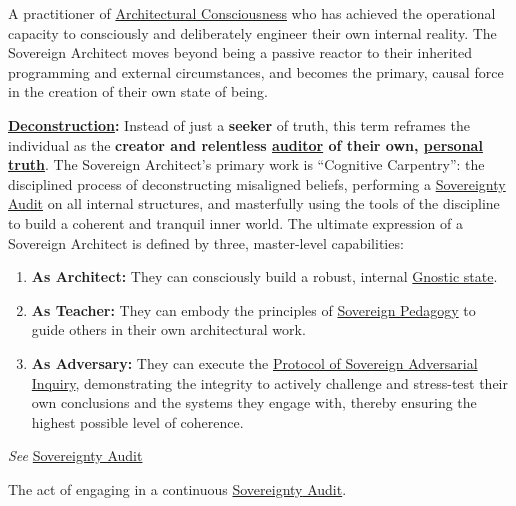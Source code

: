 \item[\hypertarget{gloss:sovereign_architect}{Sovereign Architect}]
    A practitioner of \hyperlink{gloss:architectural_consciousness}{Architectural Consciousness} who has achieved the operational capacity to consciously and deliberately engineer their own internal reality. The Sovereign Architect moves beyond being a passive reactor to their inherited programming and external circumstances, and becomes the primary, causal force in the creation of their own state of being.
    \begin{nobullet}
        \item \textbf{\hyperlink{gloss:deconstruction}{Deconstruction}:} Instead of just a \textbf{seeker} of truth, this term reframes the individual as the \textbf{creator and relentless \underline{auditor} of their own, \underline{personal truth}}. The Sovereign Architect's primary work is ``Cognitive Carpentry'': the disciplined process of deconstructing misaligned beliefs, performing a \hyperlink{gloss:sovereignty_audit}{Sovereignty Audit} on all internal structures, and masterfully using the tools of the discipline to build a coherent and tranquil inner world. The ultimate expression of a Sovereign Architect is defined by three, master-level capabilities:
        \begin{enumerate}
            \item \textbf{As Architect:} They can consciously build a robust, internal \hyperlink{gloss:gnostic_state}{Gnostic state}.
            \item \textbf{As Teacher:} They can embody the principles of \hyperlink{gloss:sovereign_pedagogy}{Sovereign Pedagogy} to guide others in their own architectural work.
            \item \textbf{As Adversary:} They can execute the \hyperlink{gloss:protocol_of_sovereign_adversarial_inquiry}{Protocol of Sovereign Adversarial Inquiry}, demonstrating the integrity to actively challenge and stress-test their own conclusions and the systems they engage with, thereby ensuring the highest possible level of coherence.
        \end{enumerate}
    \end{nobullet}

\item[\hypertarget{gloss:sovereign_audit}{Sovereign Audit}] 
    \emph{See} \hyperlink{gloss:sovereignty_audit}{Sovereignty Audit}

\item[\hypertarget{gloss:sovereign_audits}{Sovereign Audits}]
    The act of engaging in a continuous \hyperlink{gloss:sovereignty_audit}{\hyperlink{gloss:sovereignty}{\hyperlink{gloss:sovereignty}{Sovereignty}} Audit}.

